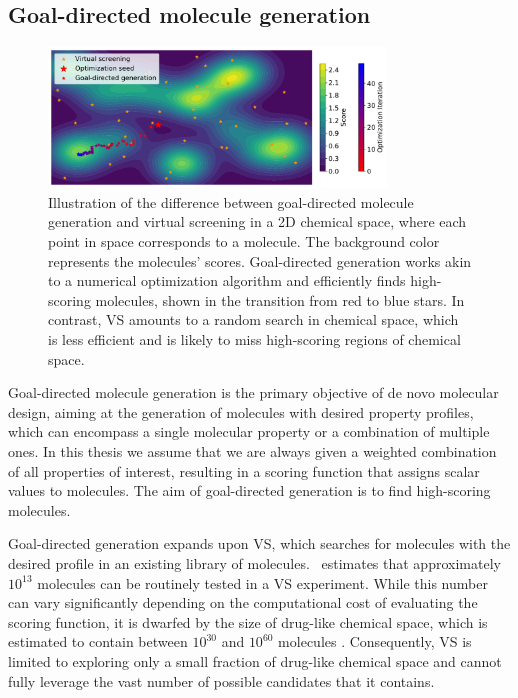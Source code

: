 \subsection{Goal-directed molecule generation}
\begin{figure}
    \centering
    \includegraphics[width=0.8\textwidth]{./figures/goal_directed_generation_vs.pdf}
    \caption{Illustration of the difference between goal-directed molecule generation and virtual
        screening in a 2D chemical space, where each point in space corresponds to a molecule. The
        background color represents the molecules' scores. Goal-directed generation works
        akin to a numerical optimization algorithm and efficiently finds high-scoring molecules,
        shown in the transition from red to blue stars. In contrast, VS amounts to a random search in chemical space, which is less efficient
        and is likely to miss high-scoring regions of chemical space. \label{fig:goal-directed-generation}}
\end{figure}

Goal-directed molecule generation is the primary objective of de novo molecular design, aiming at
the generation of molecules with desired property profiles, which can encompass a single molecular
property or a combination of multiple ones. In this thesis we assume that we are always given a
weighted combination of all properties of interest, resulting in a scoring function that assigns
scalar values to molecules. The aim of goal-directed generation is to find high-scoring molecules.

Goal-directed generation expands upon \ac{VS}, which searches for molecules with the desired profile
in an existing library of molecules.\ \citet{waltersVirtualChemicalLibraries2019} estimates that approximately
$10^{13}$ molecules can be routinely tested in a \ac{VS} experiment. While this number can vary
significantly depending on the computational cost of evaluating the scoring function, it is dwarfed
by the size of drug-like chemical space, which is estimated to contain between $10^{30}$ and
$10^{60}$ molecules \citep{waltersVirtualChemicalLibraries2019,ruddigkeitEnumeration166Billion2012}.
Consequently, \ac{VS} is limited to exploring only a small fraction of drug-like chemical space and cannot
fully leverage the vast number of possible candidates that it contains.

